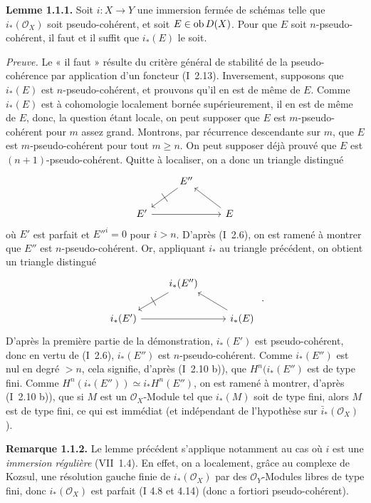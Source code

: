 \documentclass[11pt]{article}
\begin{document}
\textbf{Lemme 1.1.1.} Soit \(i:X\to Y\) une immersion fermée de schémas telle que \(i_*(\mathcal O_X)\) soit pseudo-cohérent, et soit \(E\in\operatorname{ob} D(X)\). Pour que \(E\) soit \(n\)-pseudo-cohérent, il faut et il suffit que \(i_*(E)\) le soit.

\emph{Preuve.} Le « il faut » résulte du critère général de stabilité de la pseudo-cohérence par application d'un foncteur (I~2.13). Inversement, supposons que \(i_*(E)\) est \(n\)-pseudo-cohérent, et prouvons qu'il en est de même de \(E\). Comme \(i_*(E)\) est à cohomologie localement bornée supérieurement, il en est de même de \(E\), donc, la question étant locale, on peut supposer que \(E\) est \(m\)-pseudo-cohérent pour \(m\) assez grand. Montrons, par récurrence descendante sur \(m\), que \(E\) est \(m\)-pseudo-cohérent pour tout \(m\geq n\). On peut supposer déjà prouvé que \(E\) est \((n+1)\)-pseudo-cohérent. Quitte à localiser, on a donc un triangle distingué
\[
\begin{tikzcd}
& E'' \arrow[dl,"|" marking] & \\
E' \arrow[rr] & & E \arrow[ul]
\end{tikzcd}
\]
où \(E'\) est parfait et \(E''^i=0\) pour \(i>n\). D'après (I~2.6), on est ramené à montrer que \(E''\) est \(n\)-pseudo-cohérent. Or, appliquant \(i_*\) au triangle précédent, on obtient un triangle distingué
\[
\begin{tikzcd}
& i_*(E'') \arrow[dl,"|" marking] & \\
i_*(E') \arrow[rr] & & i_*(E) \arrow[ul]
\end{tikzcd}\ .
\]
D'après la première partie de la démonstration, \(i_*(E')\) est pseudo-cohérent, donc en vertu de (I~2.6), \(i_*(E'')\) est \(n\)-pseudo-cohérent. Comme \(i_*(E'')\) est nul en degré \(>n\), cela signifie, d'après (I~2.10 b)), que \(H^n(i_*(E'')\) est de type fini. Comme \(H^n(i_*(E''))\simeq i_*H^n(E'')\), on est ramené à montrer, d'après (I~2.10 b)), que si \(M\) est un \(\mathcal O_X\)-Module tel que \(i_*(M)\) soit de type fini, alors \(M\) est de type fini, ce qui est immédiat (et indépendant de l'hypothèse sur \(\bar i_*(\mathcal O_X)\)).


\textbf{Remarque 1.1.2.} Le lemme précédent s'applique notamment au cas où \(i\) est une \emph{immersion régulière} (VII~1.4). En effet, on a localement, grâce au complexe de Kozsul, une résolution gauche finie de \(i_*(\mathcal O_X)\) par des \(\mathcal O_Y\)-Modules libres de type fini, donc \(i_*(\mathcal O_X)\) est parfait (I 4.8 et 4.14) (donc a fortiori pseudo-cohérent).
\end{document}
